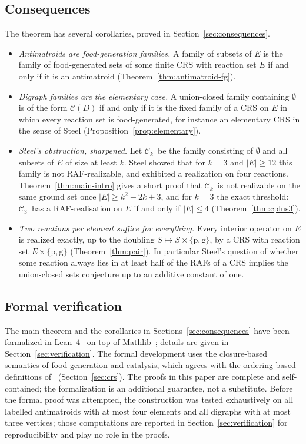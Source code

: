 \documentclass[11pt,a4paper]{article}
\theoremstyle{plain}
\theoremstyle{definition}
\theoremstyle{remark}
\newcommand{\cC}{\mathcal{C}}
\newcommand{\Cplus}[1]{\cC^{+}_{#1}}
\begin{document}
\subsection*{Consequences}

The theorem has several corollaries, proved in Section~\ref{sec:consequences}.

\begin{itemize}
\item \emph{Antimatroids are food-generation families.} A family of subsets of $E$ is the family of food-generated sets of some finite CRS with reaction set $E$ if and only if it is an antimatroid (Theorem~\ref{thm:antimatroid-fg}).
\item \emph{Digraph families are the elementary case.} A union-closed family containing $\emptyset$ is of the form $\cC(D)$ if and only if it is the fixed family of a CRS on $E$ in which every reaction set is food-generated, for instance an elementary CRS in the sense of Steel (Proposition~\ref{prop:elementary}).
\item \emph{Steel's obstruction, sharpened.} Let $\Cplus{k}$ be the family consisting of $\emptyset$ and all subsets of $E$ of size at least $k$. Steel showed that for $k=3$ and $|E|\ge 12$ this family is not RAF-realizable, and exhibited a realization on four reactions. Theorem~\ref{thm:main-intro} gives a short proof that $\Cplus{k}$ is not realizable on the same ground set once $|E|\ge k^2-2k+3$, and for $k=3$ the exact threshold: $\Cplus{3}$ has a RAF-realisation on $E$ if and only if $|E|\le 4$ (Theorem~\ref{thm:cplus3}).
\item \emph{Two reactions per element suffice for everything.} Every interior operator on $E$ is realized exactly, up to the doubling $S\mapsto S\times\{\mathrm{p},\mathrm{g}\}$, by a CRS with reaction set $E\times\{\mathrm{p},\mathrm{g}\}$ (Theorem~\ref{thm:pair}). In particular Steel's question of whether some reaction always lies in at least half of the RAFs of a CRS implies the union-closed sets conjecture up to an additive constant of one.
\end{itemize}

\subsection*{Formal verification}

The main theorem and the corollaries in Sections~\ref{sec:consequences} have been formalized in Lean~4~\cite{demoura2021lean4} on top of Mathlib~\cite{mathlib2020}; details are given in Section~\ref{sec:verification}. The formal development uses the closure-based semantics of food generation and catalysis, which agrees with the ordering-based definitions of~\cite{hordijk2004detecting,steel2023interior} (Section~\ref{sec:crs}). The proofs in this paper are complete and self-contained; the formalization is an additional guarantee, not a substitute. Before the formal proof was attempted, the construction was tested exhaustively on all labelled antimatroids with at most four elements and all digraphs with at most three vertices; those computations are reported in Section~\ref{sec:verification} for reproducibility and play no role in the proofs.
\end{document}
